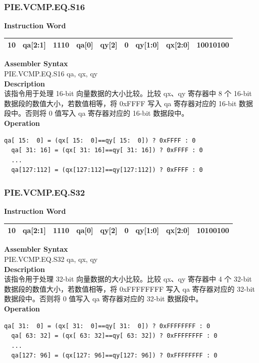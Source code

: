\newpage
\subsubsection{PIE.VCMP.EQ.S16}\label{instruction:PIEVCMPEQS16}
\setlength\tabcolsep{6pt}
\textbf{Instruction Word} \\
\begin{tabular}{|c|c|c|c|c|c|c|c|c|}
	\hline
	10 & qa[2:1] & 1110 & qa[0] & qy[2] & 0 & qy[1:0] & qx[2:0] & 10010100 \\
	\hline
\end{tabular}

\textbf{Assembler Syntax} \\
PIE.VCMP.EQ.S16 qa, qx, qy \\
\textbf{Description} \\
该指令用于处理 16-bit 向量数据的大小比较。比较 qx、qy 寄存器中 8 个 16-bit 数据段的数值大小，若数值相等，将 0xFFFF 写入 qa 寄存器对应的 16-bit 数据段中。否则将 0 值写入 qa 寄存器对应的 16-bit 数据段中。\\
\textbf{Operation}
\begin{lstlisting}[escapeinside=`?]
  qa[ 15:  0] = (qx[ 15:  0]==qy[ 15:  0]) ? 0xFFFF : 0
  qa[ 31: 16] = (qx[ 31: 16]==qy[ 31: 16]) ? 0xFFFF : 0
  ...
  qa[127:112] = (qx[127:112]==qy[127:112]) ? 0xFFFF : 0
\end{lstlisting}

\newpage
\subsubsection{PIE.VCMP.EQ.S32}\label{instruction:PIEVCMPEQS32}
\setlength\tabcolsep{6pt}
\textbf{Instruction Word} \\
\begin{tabular}{|c|c|c|c|c|c|c|c|c|}
	\hline
	10 & qa[2:1] & 1110 & qa[0] & qy[2] & 0 & qy[1:0] & qx[2:0] & 10100100 \\
	\hline
\end{tabular}

\textbf{Assembler Syntax} \\
PIE.VCMP.EQ.S32 qa, qx, qy \\
\textbf{Description} \\
该指令用于处理 32-bit 向量数据的大小比较。比较 qx、qy 寄存器中 4 个 32-bit 数据段的数值大小，若数值相等，将 0xFFFFFFFF 写入 qa 寄存器对应的 32-bit 数据段中。否则将 0 值写入 qa 寄存器对应的 32-bit 数据段中。\\
\textbf{Operation}
\begin{lstlisting}[escapeinside=`?]
  qa[ 31:  0] = (qx[ 31:  0]==qy[ 31:  0]) ? 0xFFFFFFFF : 0
  qa[ 63: 32] = (qx[ 63: 32]==qy[ 63: 32]) ? 0xFFFFFFFF : 0
  ...
  qa[127: 96] = (qx[127: 96]==qy[127: 96]) ? 0xFFFFFFFF : 0
\end{lstlisting}

